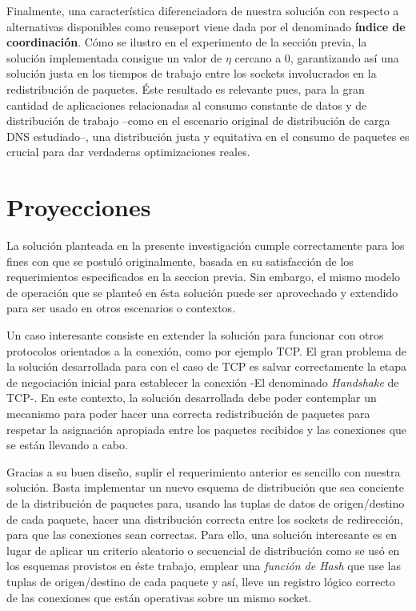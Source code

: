 Finalmente, una característica diferenciadora de nuestra solución con respecto a alternativas disponibles como reuseport viene dada por el denominado \textbf{índice de coordinación}. Cómo se ilustro en el experimento de la sección previa, la solución implementada consigue un valor de $\eta$ cercano a 0, garantizando así una solución justa en los tiempos de trabajo entre los sockets involucrados en la redistribución de paquetes. Éste resultado es relevante pues, para la gran cantidad de aplicaciones relacionadas al consumo constante de datos y de distribución de trabajo –como en el escenario original de distribución de carga DNS estudiado--, una distribución justa y equitativa en el consumo de paquetes es crucial para dar verdaderas optimizaciones reales.

\section{Proyecciones}
La solución planteada en la presente investigación cumple correctamente para los fines con que se postuló originalmente, basada en su satisfacción de los requerimientos especificados en la seccion previa. Sin embargo, el mismo modelo de operación que se planteó en ésta solución puede ser aprovechado y extendido para ser usado en otros escenarios o contextos.

Un caso interesante consiste en extender la solución para funcionar con otros protocolos orientados a la conexión, como por ejemplo TCP. El gran problema de la solución desarrollada para con el caso de TCP es salvar correctamente la etapa de negociación inicial para establecer la conexión -El denominado \emph{Handshake} de TCP-. En este contexto, la solución desarrollada debe poder contemplar un mecanismo para poder hacer una correcta redistribución de paquetes para respetar la asignación apropiada entre los paquetes recibidos y las conexiones que se están llevando a cabo.

Gracias a su buen diseño, suplir el requerimiento anterior es sencillo con nuestra solución. Basta implementar un nuevo esquema de distribución que sea conciente de la distribución de paquetes para, usando las tuplas de datos de origen/destino de cada paquete, hacer una distribución correcta entre los sockets de redirección, para que las conexiones sean correctas. Para ello, una solución interesante es en lugar de aplicar un criterio aleatorio o secuencial de distribución como se usó en los esquemas provistos en éste trabajo, emplear una \emph{función de Hash} que use las tuplas de origen/destino de cada paquete y así, lleve un registro lógico correcto de las conexiones que están operativas sobre un mismo socket.

